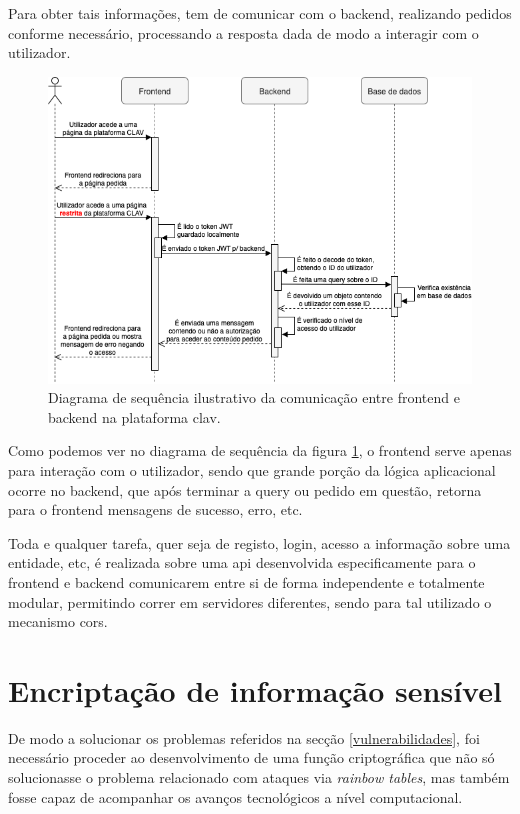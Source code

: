 Para obter tais informações, tem de comunicar com o backend, realizando pedidos conforme necessário, processando a resposta dada de modo a interagir com o utilizador. 

\begin{figure}[h!]
    \centering
    \includegraphics[width=\textwidth]{img/diagramas/sequencia/DiagramasSequencia.png}
    \caption{Diagrama de sequência ilustrativo da comunicação entre frontend e backend na plataforma \gls{clav}.}
    \label{fig:diagramaPaginaRestrita}
\end{figure}

Como podemos ver no diagrama de sequência da figura \ref{fig:diagramaPaginaRestrita}, o frontend serve apenas para interação com o utilizador, sendo que grande porção da lógica aplicacional ocorre no backend, que após terminar a query ou pedido em questão, retorna para o frontend mensagens de sucesso, erro, etc.

Toda e qualquer tarefa, quer seja de registo, login, acesso a informação sobre uma entidade, etc, é realizada sobre uma \gls{api} desenvolvida especificamente para o frontend e backend comunicarem entre si de forma independente e totalmente modular, permitindo correr em servidores diferentes, sendo para tal utilizado o mecanismo \gls{cors}.

\cleardoublepage
\section{Encriptação de informação sensível} \label{encryption}

De modo a solucionar os problemas referidos na secção \ref{vulnerabilidades}, foi necessário proceder ao desenvolvimento de uma função criptográfica que não só solucionasse o problema relacionado com ataques via \emph{rainbow tables}, mas também fosse capaz de acompanhar os avanços tecnológicos a nível computacional.

